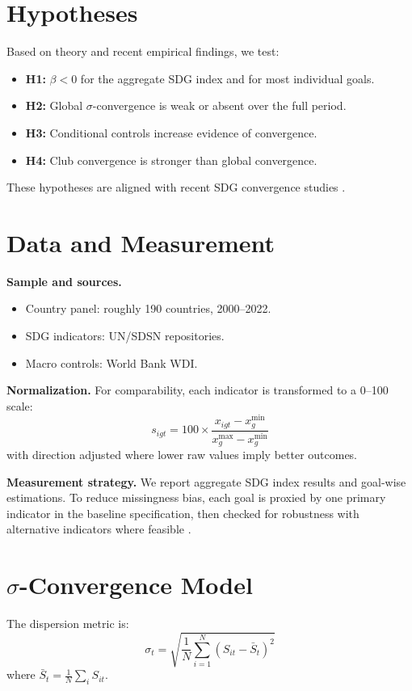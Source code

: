 \chapter{Hypotheses}
Based on theory and recent empirical findings, we test:
\begin{itemize}
    \item \textbf{H1:} $\beta < 0$ for the aggregate SDG index and for most individual goals.
    \item \textbf{H2:} Global $\sigma$-convergence is weak or absent over the full period.
    \item \textbf{H3:} Conditional controls increase evidence of convergence.
    \item \textbf{H4:} Club convergence is stronger than global convergence.
\end{itemize}
These hypotheses are aligned with recent SDG convergence studies \citep{bigerna2025,phillips2007}.

\chapter{Data and Measurement}
\textbf{Sample and sources.}
\begin{itemize}
    \item Country panel: roughly 190 countries, 2000--2022.
    \item SDG indicators: UN/SDSN repositories.
    \item Macro controls: World Bank WDI.
\end{itemize}

\textbf{Normalization.} For comparability, each indicator is transformed to a 0--100 scale:
\[
s_{igt} = 100\times \frac{x_{igt} - x_g^{\min}}{x_g^{\max} - x_g^{\min}}
\]
with direction adjusted where lower raw values imply better outcomes.

\textbf{Measurement strategy.} We report aggregate SDG index results and goal-wise estimations. To reduce missingness bias, each goal is proxied by one primary indicator in the baseline specification, then checked for robustness with alternative indicators where feasible \citep{bigerna2025,sdsn2022}.

\chapter{\texorpdfstring{$\sigma$}{Sigma}-Convergence Model}
The dispersion metric is:
\[
\sigma_t = \sqrt{\frac{1}{N}\sum_{i=1}^{N}(S_{it} - \bar{S}_t)^2}
\]
where $\bar{S}_t = \frac{1}{N}\sum_i S_{it}$.

